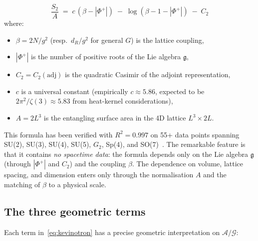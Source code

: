 \documentclass[11pt,a4paper]{amsart}
\theoremstyle{definition}
\theoremstyle{remark}
\newcommand{\calA}{\mathcal{A}}
\newcommand{\calG}{\mathcal{G}}
\newcommand{\gfrak}{\mathfrak{g}}
\newcommand{\PhiPlus}{\Phi^+}
\begin{document}
\begin{equation}\label{eq:kevinotron}
\boxed{\quad
\frac{S_2}{A} \;=\; c\,(\beta - |\PhiPlus|)
\;-\; \log(\beta - 1 - |\PhiPlus|) \;-\; C_2
\quad}
\end{equation}
where:
\begin{itemize}[leftmargin=2.5em]
\item $\beta = 2N/g^2$ (resp.\ $d_R/g^2$ for general $G$) is the lattice coupling,
\item $|\PhiPlus|$ is the number of positive roots of the Lie algebra $\gfrak$,
\item $C_2 = C_2(\mathrm{adj})$ is the quadratic Casimir of the adjoint representation,
\item $c$ is a universal constant (empirically $c \approx 5.86$, expected to be
      $2\pi^2/\zeta(3) \approx 5.83$ from heat-kernel considerations),
\item $A = 2L^3$ is the entangling surface area in the 4D lattice $L^3 \times 2L$.
\end{itemize}

This formula has been verified with $R^2 = 0.997$ on 55+ data points spanning
SU(2), SU(3), SU(4), SU(5), $G_2$, Sp(4), and SO(7)~\cite{Remondiere2026G2}.
The remarkable feature is that it contains \emph{no spacetime data}: the
formula depends only on the Lie algebra $\gfrak$ (through $|\PhiPlus|$ and $C_2$)
and the coupling $\beta$. The dependence on volume, lattice spacing, and
dimension enters only through the normalisation $A$ and the matching of $\beta$
to a physical scale.

\subsection{The three geometric terms}

Each term in~\eqref{eq:kevinotron} has a precise geometric interpretation on
$\calA/\calG$:
\end{document}
